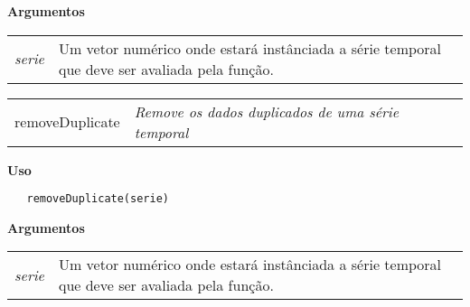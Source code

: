 \vspace{0.5cm}

\textbf{Argumentos}

\begin{table}[!ht]
\begin{center}
\begin{tabularx}{\textwidth}{X X}
\hspace{0.5cm} \textit{serie} & Um vetor numérico onde estará instânciada a série temporal que deve ser avaliada pela função.\\
\end{tabularx}
\end{center}
\end{table} 

\newpage


\hrulefill   

\begin{table}[!ht]
\begin{center}
\begin{tabularx}{\textwidth}{X X}
\hspace{0.5cm} removeDuplicate & \textit{Remove os dados duplicados de uma série temporal}\\
\end{tabularx}
\end{center}
\end{table} 

\vspace{-0.5cm}

\hrulefill  

\vspace{0.5cm}

\textbf{Uso}

\begin{lstlisting}
   removeDuplicate(serie)
\end{lstlisting}

\vspace{0.5cm}

\textbf{Argumentos}

\begin{table}[!ht]
\begin{center}
\begin{tabularx}{\textwidth}{X X}
\hspace{0.5cm} \textit{serie} & Um vetor numérico onde estará instânciada a série temporal que deve ser avaliada pela função.\\
\end{tabularx}
\end{center}
\end{table} 

